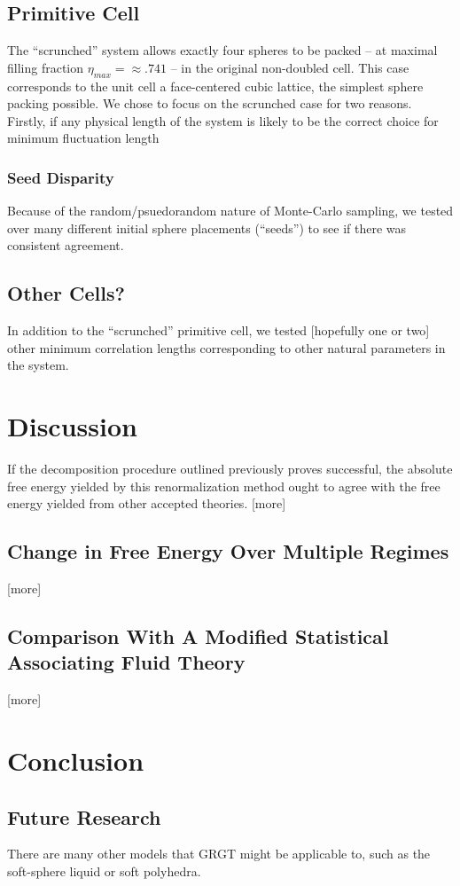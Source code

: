 \documentclass[12pt]{article}
\begin{document}
\subsection{Primitive Cell}
The ``scrunched'' system allows exactly four spheres to be packed -- at maximal filling fraction $\eta_{max} = \approx .741$ -- in the original non-doubled cell. This case corresponds to the unit cell a face-centered cubic lattice, the simplest sphere packing possible. We chose to focus on the scrunched case for two reasons. Firstly, if any physical length of the system is likely to be the correct choice for minimum fluctuation length 

\subsubsection{Seed Disparity}
Because of the random/psuedorandom nature of Monte-Carlo sampling, we tested over many different initial sphere placements (``seeds'') to see if there was consistent agreement. 
\subsection{Other Cells?}
In addition to the ``scrunched'' primitive cell, we tested [hopefully one or two] other minimum correlation lengths corresponding to other natural parameters in the system.


\section{Discussion}
If the decomposition procedure outlined previously proves successful, the absolute free energy yielded by this renormalization method ought to agree with the free energy yielded from other accepted theories. [more]
\subsection{Change in Free Energy Over Multiple Regimes}
[more]
\subsection{Comparison With A Modified Statistical Associating Fluid Theory}
[more]



\section{Conclusion}


\subsection{Future Research}
There are many other models that GRGT might be applicable to, such as the soft-sphere liquid or soft polyhedra.
%

\end{document}
